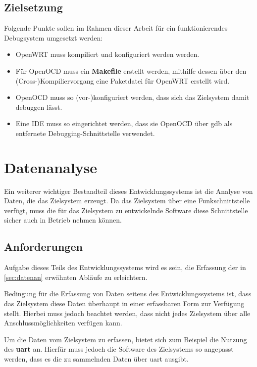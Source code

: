 \subsection{Zielsetzung}
\begin{minipage}[c]{\textwidth}
Folgende Punkte sollen im Rahmen dieser Arbeit für ein funktionierendes
Debugsystem umgesetzt werden:
\begin{itemize}
  \item OpenWRT muss kompiliert und konfiguriert werden werden.
  \item Für OpenOCD muss ein \textbf{Makefile} erstellt werden, mithilfe
  dessen über den \linebreak(Cross-)Kompiliervorgang eine Paketdatei für
  OpenWRT erstellt wird.
  \item OpenOCD muss so (vor-)konfiguriert werden, dass sich das Zielsystem
  damit debuggen lässt.
  \item Eine IDE muss so eingerichtet werden, dass sie OpenOCD über \gls{gdb}
  als entfernete Debugging-Schnittstelle verwendet.
\end{itemize}
\end{minipage}
\section{Datenanalyse}\label{sec:datenan}
Ein weiterer wichtiger Bestandteil dieses Entwicklungssystems ist die Analyse
von Daten, die das Zielsystem erzeugt. Da das Zielsystem über eine
Funkschnittstelle verfügt, muss die für das Zielsystem zu entwickelnde
Software diese Schnittstelle sicher auch in Betrieb nehmen können.
\subsection{Anforderungen}
Aufgabe dieses Teils des Entwicklungssystems wird es sein, die Erfassung der in
\autoref{sec:datenan} erwähnten Abläufe zu erleichtern.

Bedingung für die Erfassung von Daten seitens des Entwicklungssystems ist, dass
das Zielsystem diese Daten überhaupt in einer erfassbaren Form zur Verfügung
stellt. Hierbei muss jedoch beachtet werden, dass nicht jedes Zielsystem über
alle Anschlussmöglichkeiten verfügen kann.

Um die Daten vom Zielsystem zu erfassen, bietet sich zum Beispiel die Nutzung
des \textbf{\gls{uart}} an. Hierfür muss jedoch die Software des Zielsystems so
angepasst werden, dass es die zu sammelnden Daten über \gls{uart} ausgibt.

